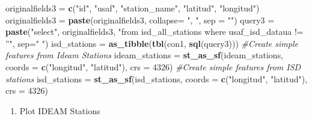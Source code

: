 \documentclass[12pt,oneside]{reedthesis}
\newenvironment{Shaded}{\begin{snugshade}}{\end{snugshade}}
\newcommand{\CommentTok}[1]{\textcolor[rgb]{0.56,0.35,0.01}{\textit{#1}}}
\newcommand{\DataTypeTok}[1]{\textcolor[rgb]{0.13,0.29,0.53}{#1}}
\newcommand{\DecValTok}[1]{\textcolor[rgb]{0.00,0.00,0.81}{#1}}
\newcommand{\KeywordTok}[1]{\textcolor[rgb]{0.13,0.29,0.53}{\textbf{#1}}}
\newcommand{\NormalTok}[1]{#1}
\newcommand{\StringTok}[1]{\textcolor[rgb]{0.31,0.60,0.02}{#1}}
\providecommand{\tightlist}{%
  \setlength{\itemsep}{0pt}\setlength{\parskip}{0pt}}
\begin{document}
\begin{Shaded}
\begin{Highlighting}[]
\NormalTok{originalfields3 =}\StringTok{ }\KeywordTok{c}\NormalTok{(}\StringTok{"id"}\NormalTok{, }\StringTok{"usaf"}\NormalTok{, }\StringTok{"station_name"}\NormalTok{, }\StringTok{"latitud"}\NormalTok{, }\StringTok{"longitud"}\NormalTok{)}
\NormalTok{originalfields3 =}\StringTok{ }\KeywordTok{paste}\NormalTok{(originalfields3, }\DataTypeTok{collapse=} \StringTok{", "}\NormalTok{, }\DataTypeTok{sep =} \StringTok{""}\NormalTok{)}
\NormalTok{query3 =}\StringTok{ }\KeywordTok{paste}\NormalTok{(}\StringTok{"select"}\NormalTok{, originalfields3, }\StringTok{"from isd_all_stations where usaf_isd_dataua != ''"}\NormalTok{, }\DataTypeTok{sep=}\StringTok{" "}\NormalTok{)}
\NormalTok{isd_stations =}\StringTok{ }\KeywordTok{as_tibble}\NormalTok{(}\KeywordTok{tbl}\NormalTok{(con1, }\KeywordTok{sql}\NormalTok{(query3)))}
\CommentTok{#Create simple features from Ideam Stations}
\NormalTok{ideam_stations =}\StringTok{ }\KeywordTok{st_as_sf}\NormalTok{(ideam_stations, }\DataTypeTok{coords =} \KeywordTok{c}\NormalTok{(}\StringTok{"longitud"}\NormalTok{, }\StringTok{"latitud"}\NormalTok{), }\DataTypeTok{crs =} \DecValTok{4326}\NormalTok{)}
\CommentTok{#Create simple features from ISD stations}
\NormalTok{isd_stations =}\StringTok{ }\KeywordTok{st_as_sf}\NormalTok{(isd_stations, }\DataTypeTok{coords =} \KeywordTok{c}\NormalTok{(}\StringTok{"longitud"}\NormalTok{, }\StringTok{"latitud"}\NormalTok{), }\DataTypeTok{crs =} \DecValTok{4326}\NormalTok{)}
\end{Highlighting}
\end{Shaded}
\normalsize
\begin{enumerate}
\def\labelenumi{\arabic{enumi}.}
\setcounter{enumi}{2}
\tightlist
\item
  Plot IDEAM Stations
\end{enumerate}
\tiny
\end{document}
